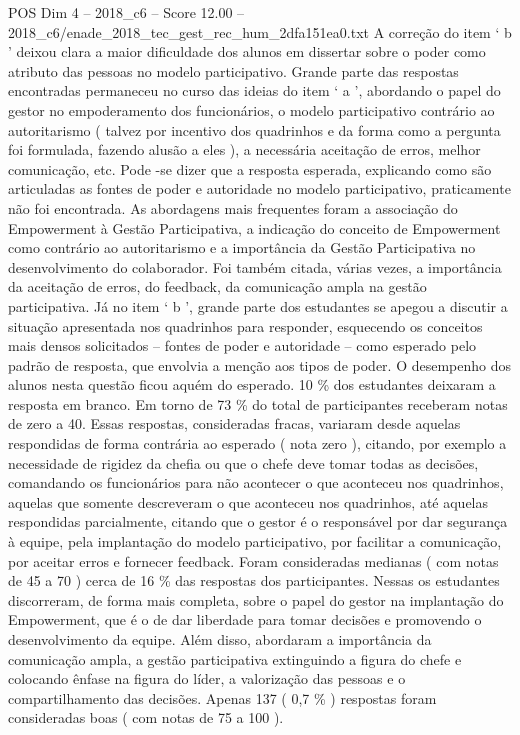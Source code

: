 \begin{textsample}{POS Dim 4 – 2018\_c6 – Score 12.00 – 2018\_c6/enade\_2018\_tec\_gest\_rec\_hum\_2dfa151ea0.txt}
A correção do item ‘ b ’ deixou clara a maior dificuldade dos alunos em dissertar sobre o poder como atributo das pessoas no modelo participativo.
Grande parte das respostas encontradas permaneceu no curso das ideias do item ‘ a ’, abordando o papel do gestor no empoderamento dos funcionários, o modelo participativo contrário ao autoritarismo ( talvez por incentivo dos quadrinhos e da forma como a pergunta foi formulada, fazendo alusão a eles ), a necessária aceitação de erros, melhor comunicação, etc.
Pode -se dizer que a resposta esperada, explicando como são articuladas as fontes de poder e autoridade no modelo participativo, praticamente não foi encontrada.
As abordagens mais frequentes foram a associação do Empowerment à Gestão Participativa, a indicação do conceito de Empowerment como contrário ao autoritarismo e a importância da Gestão Participativa no desenvolvimento do colaborador.
Foi também citada, várias vezes, a importância da aceitação de erros, do feedback, da comunicação ampla na gestão participativa.
Já no item ‘ b ’, grande parte dos estudantes se apegou a discutir a situação apresentada nos quadrinhos para responder, esquecendo os conceitos mais densos solicitados – fontes de poder e autoridade – como esperado pelo padrão de resposta, que envolvia a menção aos tipos de poder.
O desempenho dos alunos nesta questão ficou aquém do esperado. 10 \% dos estudantes deixaram a resposta em branco.
Em torno de 73 \% do total de participantes receberam notas de zero a 40.
Essas respostas, consideradas fracas, variaram desde aquelas respondidas de forma contrária ao esperado ( nota zero ), citando, por exemplo a necessidade de rigidez da chefia ou que o chefe deve tomar todas as decisões, comandando os funcionários para não acontecer o que aconteceu nos quadrinhos, aquelas que somente descreveram o que aconteceu nos quadrinhos, até aquelas respondidas parcialmente, citando que o gestor é o responsável por dar segurança à equipe, pela implantação do modelo participativo, por facilitar a comunicação, por aceitar erros e fornecer feedback.
Foram consideradas medianas ( com notas de 45 a 70 ) cerca de 16 \% das respostas dos participantes.
Nessas os estudantes discorreram, de forma mais completa, sobre o papel do gestor na implantação do Empowerment, que é o de dar liberdade para tomar decisões e promovendo o desenvolvimento da equipe.
Além disso, abordaram a importância da comunicação ampla, a gestão participativa extinguindo a figura do chefe e colocando ênfase na figura do líder, a valorização das pessoas e o compartilhamento das decisões.
Apenas 137 ( 0,7 \% ) respostas foram consideradas boas ( com notas de 75 a 100 ).

\end{textsample}
